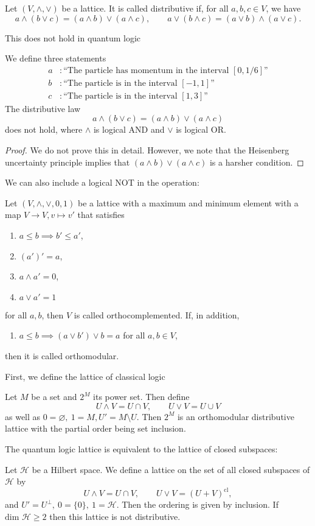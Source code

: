 \documentclass[twoside,symmetric, openany, 12pt]{./tuftebook}
\theoremstyle{definition}
\theoremstyle{definition}
\theoremstyle{definition}
\begin{document}
\begin{Definition}
	Let $(V, \wedge, \vee)$ be a lattice. It is called distributive if, for all $a,b,c\in V$, we have
	\[
	a\wedge (b\vee c)=(a\wedge b)\vee(a\wedge c),\qquad a\vee (b\wedge c)=(a\vee b)\wedge(a\vee c)
	.\] 
\end{Definition}
This does not hold in quantum logic
\begin{Example}
	We define three statements
	\begin{align*}
		a&:\text{``The particle has momentum in the interval $[0,1 / 6]$''}\\
		b&:\text{``The particle is in the interval $[-1,1]$''}\\
		c&: \text{``The particle is in the interval $[1,3]$''}
	\end{align*}
	The distributive law
	\[
	a\wedge (b\vee c) = (a \wedge b)\vee (a \wedge c)
	\]
	does not hold, where $\wedge$ is logical AND and $\vee$ is logical OR.
\end{Example}
\begin{proof}
	We do not prove this in detail. However, we note that the Heisenberg uncertainty principle implies that $(a\wedge b)\vee (a \wedge c)$ is a harsher condition.
\end{proof}
We can also include a logical NOT in the operation:
\begin{Definition}
	Let $(V, \wedge, \vee, 0, 1)$ be a lattice with a maximum and minimum element with a map $V\to V, v\mapsto v'$ that satisfies
	\begin{enumerate}[label=(\alph*)]
	\item $a\le b\implies b' \le a'$,
	\item $(a')'=a$,
	\item $a\wedge a' = 0$,
	\item $a\vee a'=1$
	\end{enumerate}
	for all $a,b$, then $V$ is called orthocomplemented. If, in addition,
	\begin{enumerate}[label=(\alph*), resume]
		\item $a\le b \implies (a\vee b')\vee b = a$ for all $a,b\in V$,
	\end{enumerate}
	then it is called orthomodular.
\end{Definition}
First, we define the lattice of classical logic
\begin{Example}
	Let $M$ be a set and $2^M$ its power set. Then define
	\[
	U\wedge V = U \cap V, \qquad U\vee V = U \cup V
\]
as well as $0=\varnothing,~1=M, U'= M \setminus U$. Then $2^M$ is an orthomodular distributive lattice with the partial order being set inclusion.
\end{Example}
The quantum logic lattice is equivalent to the lattice of closed subspaces:
\begin{Example}
	Let $\mathcal{H}$ be a Hilbert space. We define a lattice on the set of all closed subspaces of $\mathcal{H}$ by
	\[
		U\wedge V = U \cap V,\qquad U\vee V = (U + V)^\text{cl}
	,\]
	and $U' = U^\perp,~0=\{0\},~1=\mathcal{H}$. Then the ordering is given by inclusion. If $\text{dim }\mathcal{H}\ge 2$ then this lattice is not distributive.
\end{Example}
\end{document}
